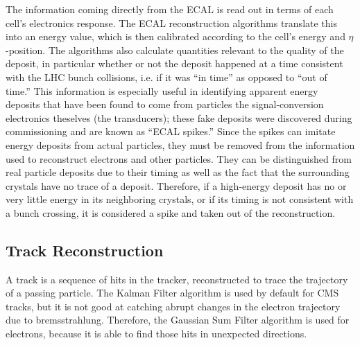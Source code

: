 The information coming directly from the ECAL 
is read out in terms of each cell's electronics response.  
The ECAL reconstruction algorithms translate this into 
an energy value, which is then calibrated 
according to the cell's energy %
and 
$\eta$-position.  
The algorithms also calculate quantities 
relevant to the quality of the deposit, 
in particular whether or not the deposit happened 
at a time consistent with the LHC 
bunch collisions, i.e. if it was ``in time'' 
as opposed to ``out of time.''  
This information is especially useful in 
identifying apparent energy deposits that have 
been found to come from particles  
the signal-conversion electronics theselves (the transducers); %
these fake deposits were discovered during 
commissioning and are known as ``ECAL spikes.''  
Since the spikes can imitate energy deposits from 
actual 
particles, %
they must be removed from the information used 
to reconstruct electrons and other particles.  
They can be distinguished from real particle deposits 
due to their timing 
as well as the fact that the surrounding crystals 
have no trace of a deposit.  
Therefore, if a high-energy deposit has no or 
very little energy in its neighboring crystals, 
or if its timing is not consistent with a bunch 
crossing, 
it is considered a spike and taken out of the 
reconstruction.  



\subsection{Track Reconstruction}
\label{evReco:track}
A track is a sequence of hits in the tracker, 
reconstructed to trace the trajectory of a passing 
particle.  
The Kalman Filter algorithm is used by default for CMS tracks, 
but it is not good at catching abrupt changes in the 
electron trajectory due to bremsstrahlung.  
Therefore, the Gaussian Sum Filter algorithm 
is used for electrons, 
because it is able to find 
those hits in unexpected directions.  

